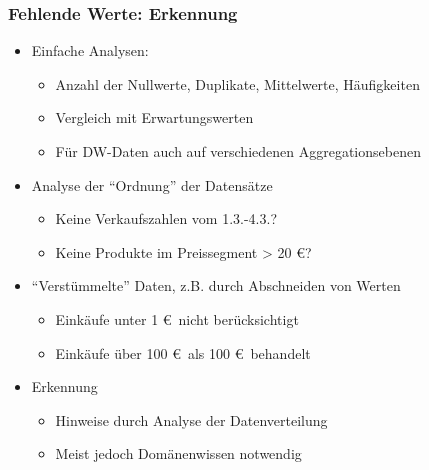     
    \begin{frame}
    \frametitle{Fehlende Werte: Erkennung}
    
    \begin{itemize}
    \item Einfache Analysen: 
    \begin{itemize}
    \item Anzahl der Nullwerte, Duplikate, Mittelwerte, Häufigkeiten
    \item Vergleich mit Erwartungswerten
    \item Für DW-Daten auch auf verschiedenen Aggregationsebenen
    \end{itemize}
    \item Analyse der "`Ordnung"' der Datensätze
    \begin{itemize}
    \item Keine Verkaufszahlen vom 1.3.-4.3.?
    \item Keine Produkte im Preissegment > 20 \euro?
    \end{itemize}
    \item "`Verstümmelte"' Daten, z.B. durch Abschneiden von Werten
    \begin{itemize}
    \item Einkäufe unter 1 \euro\ nicht berücksichtigt
    \item Einkäufe über 100 \euro\ als 100 \euro\ behandelt
    \end{itemize}
    \item Erkennung
    \begin{itemize}
    \item Hinweise durch Analyse der Datenverteilung
    \item Meist jedoch Domänenwissen notwendig 
    \end{itemize}
    \end{itemize}
    
    \end{frame}
    
    
